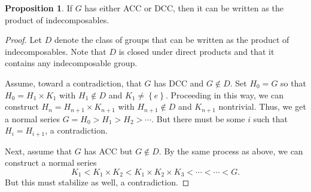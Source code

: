\documentclass[10pt,letterpaper,cm]{nupset}
\theoremstyle{definition}
\theoremstyle{theorem}
\newtheorem{prop}[definition]{Proposition}
\theoremstyle{remark}
\newcommand{\1}{\mathbf{1}}
\newcommand{\0}{\vec 0}
\newcommand{\dcc}{\textsf{DCC}\xspace}
\newcommand{\acc}{\textsf{ACC}\xspace}
\begin{document}
\begin{prop}\label{lp}
If $G$ has either \acc or \dcc, then it can be written as the product of indecomposables.
\end{prop}
\begin{proof}
Let $D$ denote the class of groups that can be written as the product of indecomposables. Note that $D$ is closed under direct products and that it contains any indecomposable group. 

\smallskip

 Assume, toward a contradiction, that $G$ has \dcc and $G \notin D$. Set $H_0 = G$ so that $H_0 = H_1 \times K_1$ with $H_1 \notin D$ and $K_1 \ne \left\{e\right\}$. Proceeding in this way, we can construct $H_n = H_{n+1} \times K_{n+1}$ with $H_{n+1} \notin D$ and $K_{n+1}$ nontrivial. Thus, we get a normal series $G= H_0 > H_1 > H_2 > \cdots$. But there must be some $i$ such that $H_i = H_{i+1}$, a contradiction.

\smallskip

 Next, assume that $G$ has \acc but $G \notin D$. By the same process as above, we can construct a normal series $$K_1 < K_1 \times K_2 < K_1 \times K_2 \times K_3 < \cdots < \cdots < G.$$ But this must stabilize as well, a contradiction.
\end{proof}
\end{document}
